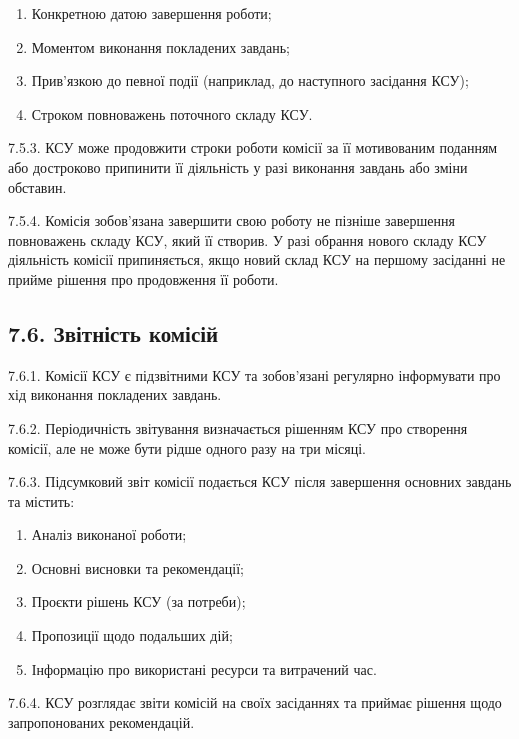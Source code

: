         \begin{enumerate}[label=\alph*)]
            \item Конкретною датою завершення роботи;
            \item Моментом виконання покладених завдань;
            \item Прив'язкою до певної події (наприклад, до наступного засідання КСУ);
            \item Строком повноважень поточного складу КСУ.
        \end{enumerate}

    7.5.3. КСУ може продовжити строки роботи комісії за її мотивованим поданням або достроково припинити її діяльність у разі виконання завдань або зміни обставин.

    7.5.4. Комісія зобов'язана завершити свою роботу не пізніше завершення повноважень складу КСУ, який її створив. У разі обрання нового складу КСУ діяльність комісії припиняється, якщо новий склад КСУ на першому засіданні не прийме рішення про продовження її роботи.

\subsection*{7.6. Звітність комісій}
    7.6.1. Комісії КСУ є підзвітними КСУ та зобов'язані регулярно інформувати про хід виконання покладених завдань.

    7.6.2. Періодичність звітування визначається рішенням КСУ про створення комісії, але не може бути рідше одного разу на три місяці.

    7.6.3. Підсумковий звіт комісії подається КСУ після завершення основних завдань та містить:

        \begin{enumerate}[label=\alph*)]
            \item Аналіз виконаної роботи;
            \item Основні висновки та рекомендації;
            \item Проєкти рішень КСУ (за потреби);
            \item Пропозиції щодо подальших дій;
            \item Інформацію про використані ресурси та витрачений час.
        \end{enumerate}

    7.6.4. КСУ розглядає звіти комісій на своїх засіданнях та приймає рішення щодо запропонованих рекомендацій.

